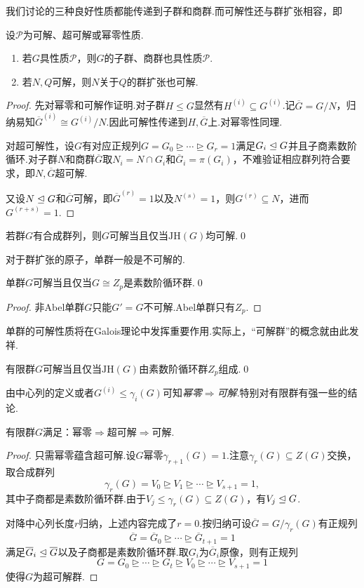 我们讨论的三种良好性质都能传递到子群和商群.而可解性还与群扩张相容，即
\begin{prop}
	设$\mathcal{P}$为可解、超可解或幂零性质.
	\begin{enumerate}
		\item 若$G$具性质$\mathcal{P}$，则$G$的子群、商群也具性质$\mathcal{P}$.
		\item 若$N,Q$可解，则$N$关于$Q$的群扩张也可解.
	\end{enumerate}
\end{prop}
\begin{proof}
	先对幂零和可解作证明.对子群$H\le G$显然有$H^{(i)}\subseteq G^{(i)}$.记$\overline{G}=G/N$，归纳易知$\overline{G}^{(i)}\cong G^{(i)}/N$.因此可解性传递到$H,\overline{G}$上.对幂零性同理.

	对超可解性，设$G$有对应正规列$G=G_0\trianglerighteq\cdots\trianglerighteq G_r=1$满足$G_i\trianglelefteq G$并且子商素数阶循环.对子群$N$和商群$\overline{G}$取$N_i=N\cap G_i$和$\overline{G}_i=\pi(G_i)$，不难验证相应群列符合要求，即$N,\overline{G}$超可解.
	
	又设$N\trianglelefteq G$和$\overline{G}$可解，即$\overline{G}^{(r)}=1$以及$N^{(s)}=1$，则$G^{(r)}\subseteq N$，进而$G^{(r+s)}=1$.
\end{proof}
\begin{cor*}
	若群$G$有合成群列，则$G$可解当且仅当$\mathrm{JH}(G)$均可解.\qed
\end{cor*}

对于群扩张的原子，单群一般是不可解的.
\begin{prop}
	单群$G$可解当且仅当$G\cong Z_p$是素数阶循环群.\qed
\end{prop}
\begin{proof}
	非Abel单群$G$只能$G'=G$不可解.Abel单群只有$Z_p$.
\end{proof}
\begin{remark}
	单群的可解性质将在Galois理论中发挥重要作用.实际上，“可解群”的概念就由此发祥.
\end{remark}
\begin{cor*}
	有限群$G$可解当且仅当$\mathrm{JH}(G)$由素数阶循环群$Z_p$组成.\qed
\end{cor*}

由中心列的定义或者$G^{(i)}\le\gamma_i(G)$可知\emph{幂零}$\Rightarrow$\emph{可解}.特别对有限群有强一些的结论.
\begin{prop}
	有限群$G$满足：幂零$\Rightarrow$超可解$\Rightarrow$可解.
\end{prop}
\begin{proof}
	只需幂零蕴含超可解.设$G$幂零$\gamma_{r+1}(G)=1$.注意$\gamma_r(G)\subseteq Z(G)$交换，取合成群列
	\[
		\gamma_r(G)=V_0\trianglerighteq V_1\trianglerighteq\cdots\trianglerighteq V_{s+1}=1,
	\]
	其中子商都是素数阶循环群.由于$V_j\le \gamma_r(G)\subseteq Z(G)$，有$V_j\trianglelefteq G$.
	
	对降中心列长度$r$归纳，上述内容完成了$r=0$.按归纳可设$\overline{G}=G/\gamma_r(G)$有正规列
	\[
		\overline{G}=\overline{G}_0\trianglerighteq\cdots\trianglerighteq\overline{G}_{t+1}=1
	\]
	满足$\overline{G}_i\trianglelefteq\overline{G}$以及子商都是素数阶循环群.取$G_i$为$\overline{G}_i$原像，则有正规列
	\[
		G=G_0\trianglerighteq\cdots\trianglerighteq G_t\trianglerighteq V_0\trianglerighteq\cdots\trianglerighteq V_{s+1}=1
	\]
	使得$G$为超可解群.
\end{proof}

